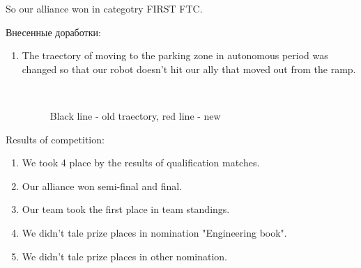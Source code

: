 So our alliance won in categotry FIRST FTC.\newline

Внесенные доработки:
\begin{enumerate}
	\item The traectory of moving to the parking zone in autonomous period was changed so that our robot doesn't hit our ally that moved out from the ramp.
	\begin{figure}[H]
		\begin{minipage}[h]{0.2\linewidth}
			\center  
		\end{minipage}
		\begin{minipage}[h]{0.6\linewidth}
			\caption{Black line - old traectory, red line - new}
		\end{minipage}
	\end{figure}
	
\end{enumerate}

Results of competition:
\begin{enumerate}
	\item We took 4 place by the results of qualification matches.
	
	\item Our alliance won semi-final and final.
	
	\item Our team took the first place in team standings.
	
	\item We didn't tale prize places in nomination "Engineering book".
	
	\item We didn't tale prize places in other nomination.
\end{enumerate}

